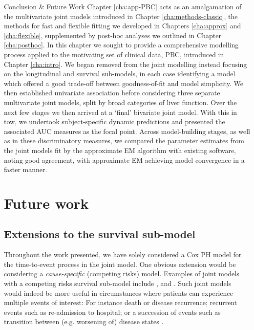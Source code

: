 \begin{chapter}{\label{cha:conclusion}Conclusion \& Future Work}
Chapter \ref{cha:app-PBC} acts as an amalgamation of the multivariate joint models introduced in Chapter \ref{cha:methods-classic}, the methods for fast and flexible fitting we developed in Chapters \ref{cha:approx} and \ref{cha:flexible}, supplemented by post-hoc analyses we outlined in Chapter \ref{cha:posthoc}. In this chapter we sought to provide a comprehensive modelling process applied to the motivating set of clinical data, PBC, introduced in Chapter \ref{cha:intro}. We began removed from the joint modelling instead focusing on the longitudinal and survival sub-models, in each case identifying a model which offered a good trade-off between goodness-of-fit and model simplicity. We then established univariate association before considering three separate multivariate joint models, split by broad categories of liver function. Over the next few stages we then arrived at a `final' bivariate joint model. With this in tow, we undertook subject-specific dynamic predictions and presented the associated AUC measures as the focal point. Across model-building stages, as well as in these discriminatory measures, we compared the parameter estimates from the joint models fit by the approximate EM algorithm with existing software, noting good agreement, with approximate EM achieving model convergence in a faster manner.

\section{Future work}
\subsection{Extensions to the survival sub-model}\label{sec:conclusion-future-survival}
Throughout the work presented, we have solely considered a Cox PH model for the time-to-event process in the joint model. One obvious extension would be considering a \textit{cause-specific} (\ie competing risks) model. Examples of joint models with a competing risks survival sub-model include \citet{Williamson2008}, \citet{Li2010} and \citet{Rustand2023}. Such joint models would indeed be more useful in circumstances where patients can experience multiple events of interest: For instance death or disease recurrence; recurrent events such as re-admission to hospital; or a succession of events such as transition between (e.g. worsening of) disease states \citep{Hickey2018B}.


\end{chapter}
